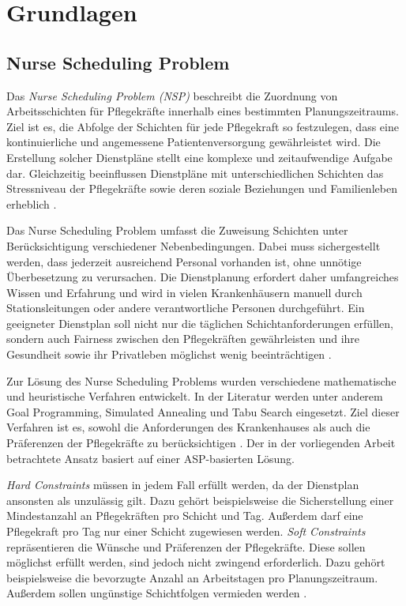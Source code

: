 \cleardoubleoddpage%
\chapter{Grundlagen}
\label{sec:example}

\section{Nurse Scheduling Problem}
Das \textit{Nurse Scheduling Problem (NSP)} beschreibt die Zuordnung von Arbeitsschichten für Pflegekräfte innerhalb eines bestimmten Planungszeitraums. Ziel ist es, die Abfolge der Schichten für jede Pflegekraft so festzulegen, dass eine kontinuierliche und angemessene Patientenversorgung gewährleistet wird. Die Erstellung solcher Dienstpläne stellt eine komplexe und zeitaufwendige Aufgabe dar. Gleichzeitig beeinflussen Dienstpläne mit unterschiedlichen Schichten das Stressniveau der Pflegekräfte sowie deren soziale Beziehungen und Familienleben erheblich \parencite{Oughalime2008}.

Das Nurse Scheduling Problem umfasst die Zuweisung Schichten unter Berücksichtigung verschiedener Nebenbedingungen. Dabei muss sichergestellt werden, dass jederzeit ausreichend Personal vorhanden ist, ohne unnötige Überbesetzung zu verursachen. Die Dienstplanung erfordert daher umfangreiches Wissen und Erfahrung und wird in vielen Krankenhäusern manuell durch Stationsleitungen oder andere verantwortliche Personen durchgeführt. Ein geeigneter Dienstplan soll nicht nur die täglichen Schichtanforderungen erfüllen, sondern auch Fairness zwischen den Pflegekräften gewährleisten und ihre Gesundheit sowie ihr Privatleben möglichst wenig beeinträchtigen \parencite{Oughalime2008}.

Zur Lösung des Nurse Scheduling Problems wurden verschiedene mathematische und heuristische Verfahren entwickelt. In der Literatur werden unter anderem Goal Programming, Simulated Annealing und Tabu Search eingesetzt. Ziel dieser Verfahren ist es, sowohl die Anforderungen des Krankenhauses als auch die Präferenzen der Pflegekräfte zu berücksichtigen \parencite{Oughalime2008}. Der in der vorliegenden Arbeit betrachtete Ansatz basiert auf einer ASP-basierten Lösung. 

\textit{Hard Constraints} müssen in jedem Fall erfüllt werden, da der Dienstplan ansonsten als unzulässig gilt. Dazu gehört beispielsweise die Sicherstellung einer Mindestanzahl an Pflegekräften pro Schicht und Tag. Außerdem darf eine Pflegekraft pro Tag nur einer Schicht zugewiesen werden. 
\textit{Soft Constraints} repräsentieren die Wünsche und Präferenzen der Pflegekräfte. Diese sollen möglichst erfüllt werden, sind jedoch nicht zwingend erforderlich. Dazu gehört beispielsweise die bevorzugte Anzahl an Arbeitstagen pro Planungszeitraum. Außerdem sollen ungünstige Schichtfolgen vermieden werden \parencite{Oughalime2008}.

